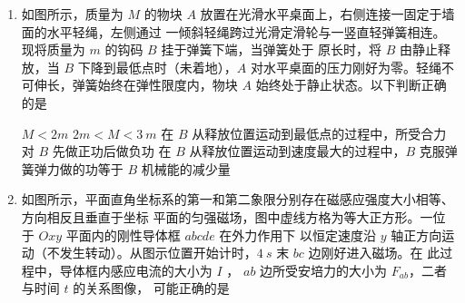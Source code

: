 \begin{enumerate}
\item
如图所示，质量为 $ M $ 的物块 $ A $ 放置在光滑水平桌面上，右侧连接一固定于墙面的水平轻绳，左侧通过
一倾斜轻绳跨过光滑定滑轮与一竖直轻弹簧相连。现将质量为 $ m $ 的钩码 $ B $ 挂于弹簧下端，当弹簧处于
原长时，将 $ B $ 由静止释放，当 $ B $ 下降到最低点时（未着地），$ A $ 对水平桌面的压力刚好为零。轻绳不
可伸长，弹簧始终在弹性限度内，物块 $ A $ 始终处于静止状态。以下判断正确的是  
\begin{figure}[h!]
\centering

\end{figure}


\fourchoices
{$ M<2m $}
{$ 2m<M<3 \ m $}
{在 $ B $ 从释放位置运动到最低点的过程中，所受合力对 $ B $ 先做正功后做负功}
{在 $ B $ 从释放位置运动到速度最大的过程中，$ B $ 克服弹簧弹力做的功等于 $ B $ 机械能的减少量}






\item 
如图所示，平面直角坐标系的第一和第二象限分别存在磁感应强度大小相等、方向相反且垂直于坐标
平面的匀强磁场，图中虚线方格为等大正方形。一位于 $ Oxy $ 平面内的刚性导体框 $ abcde $ 在外力作用下
以恒定速度沿 $ y $ 轴正方向运动（不发生转动）。从图示位置开始计时，$ 4 \ s $ 末 $ bc $ 边刚好进入磁场。在
此过程中，导体框内感应电流的大小为 $ I $ ， $ ab $ 边所受安培力的大小为 $ F_{ab} $，二者与时间 $ t $ 的关系图像，
可能正确的是  
\begin{figure}[h!]
\centering

\end{figure}

\pfourchoices
{}
{}
{}
{}









\gaokaosy


\end{enumerate}
